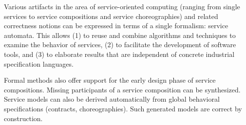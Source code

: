\begin{niceenumerate}
\item Various artifacts in the area of service-oriented computing (ranging from single services to service compositions and service choreographies) and related correctness notions can be expressed in terms of a single formalism: service automata. This allows (1) to reuse and combine algorithms and techniques to examine the behavior of services, (2) to facilitate the development of software tools, and (3) to elaborate results that are independent of concrete industrial specification languages.



\item Formal methods also offer support for the early design phase of service compositions. Missing participants of a service composition can be synthesized. Service models can also be derived automatically from global behavioral specifications (contracts, choreographies). Such generated models are correct by construction.

 ${}$ 
\end{niceenumerate}
